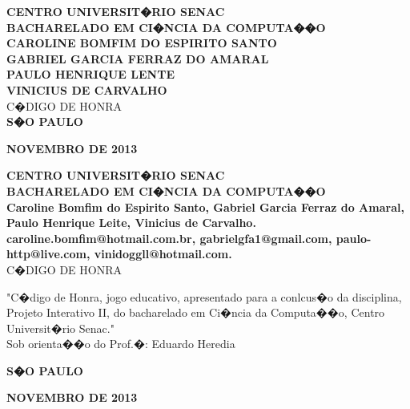 \documentclass[a4paper]{article}
\begin{document}
\begin{titlepage}
 \vfill
  \begin{center}
   {\large \textbf{CENTRO UNIVERSIT�RIO SENAC}} \\
   {\large \textbf{BACHARELADO EM CI�NCIA DA COMPUTA��O}} \\[4cm]

   {\large \textbf{CAROLINE BOMFIM DO ESPIRITO SANTO}}\\
   {\large \textbf{GABRIEL GARCIA FERRAZ DO AMARAL}}\\
   {\large \textbf{PAULO HENRIQUE LENTE}}\\
   {\large \textbf{VINICIUS DE CARVALHO}}\\[4cm]


   {\Large C�DIGO DE HONRA}\\[4cm]

\vspace{2cm}
\large \textbf{S�O PAULO}

\large \textbf{NOVEMBRO DE 2013}
\end{center}
\end{titlepage}

\break

\begin{titlepage}
 \vfill
  \begin{center}
   {\large \textbf{CENTRO UNIVERSIT�RIO SENAC}} \\
   {\large \textbf{BACHARELADO EM CI�NCIA DA COMPUTA��O}} \\[4cm]

   {\large \textbf{Caroline Bomfim do Espirito Santo, Gabriel Garcia Ferraz do Amaral, Paulo Henrique Leite, Vinicius de Carvalho.}}\\ [1cm]
  
   {\large \textbf{caroline.bomfim@hotmail.com.br, gabrielgfa1@gmail.com, paulo-http@live.com, vinidoggll@hotmail.com.}}\\ [3cm]
   
 
   {\Large C�DIGO DE HONRA}\\[2cm]

   \hspace{.45\textwidth} 
   \begin{minipage}{.5\textwidth}
   \large "C�digo de Honra, jogo educativo, apresentado para a conlcus�o da disciplina, Projeto Interativo II, do bacharelado em Ci�ncia da Computa��o, Centro Universit�rio Senac."\\[0.5cm]
			Sob orienta��o do Prof.�: Eduardo Heredia
  \end{minipage}
  \vfill

\vspace{1cm}
\large \textbf{S�O PAULO}

\large \textbf{NOVEMBRO DE 2013}
\end{center}
\end{titlepage}
\end{document}
